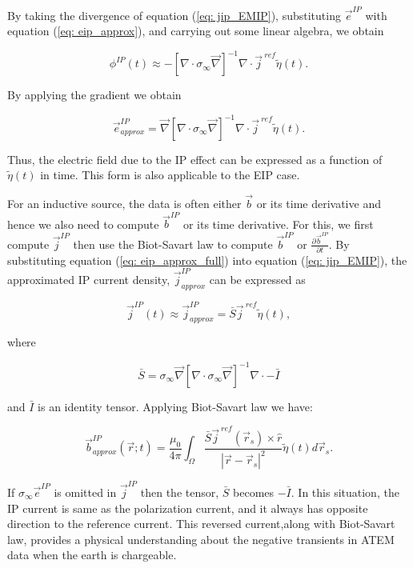 \documentclass[extra,mreferee]{gji}
\renewcommand{\div}{\nabla\cdot}
\newcommand{\grad}{\vec \nabla}
\newcommand{\siginf}{\sigma_\infty}
\renewcommand {\j}  { {\vec j} }
\renewcommand {\b}  { {\vec b} }
\newcommand {\e}  { {\vec e} }
\newcommand{\peta}{\tilde{\eta}}
\newcommand{\jref}{\j^{\ ref}}
\begin{document}
By taking the divergence of  equation (\ref{eq: jip_EMIP}), substituting  $\e^{IP}$ with equation (\ref{eq: eip_approx}), and carrying out some linear algebra, we obtain
\begin{linenomath*}
\begin{equation}
  \phi^{IP}(t) \approx -[\div \siginf\grad]^{-1}\div\jref\peta(t).
  \label{eq: phiIPapprox_general}
\end{equation}
\end{linenomath*}
By applying the gradient we obtain 
\begin{linenomath*}
\begin{equation}
    \e^{IP}_{approx} = \grad[\div \siginf\grad]^{-1}\div\jref\peta(t).
    \label{eq: eip_approx_full}
\end{equation}
\end{linenomath*}
Thus, the electric field due to the IP effect can be expressed as a function of $\peta(t)$ in time. 
This form is also applicable to the  EIP case.   

For an inductive source, the data is often either $\b$ or its time derivative and hence we also need to compute $\b^{IP}$ or its time derivative.
For this, we first compute $\j^{IP}$ then use the Biot-Savart law to compute $\b^{IP}$ or $\frac{\partial \b^{IP}}{\partial t}$. 
By substituting equation (\ref{eq: eip_approx_full}) into equation (\ref{eq: jip_EMIP}), the approximated IP current density, $\j^{IP}_{approx}$ can be expressed as
\begin{linenomath*}
\begin{equation}
  \j^{IP}(t) \approx \j^{IP}_{approx} = \bar{S}\jref\peta(t),
  \label{eq: jip_approx}
\end{equation}
\end{linenomath*}
where
\begin{linenomath*}
\begin{equation}
  \bar{S} = \siginf\grad[\div \siginf\grad]^{-1}\div-\bar{I}
\end{equation}
\end{linenomath*}
and $\bar{I}$ is an identity tensor. 
Applying Biot-Savart law we have:
\begin{linenomath*}
\begin{equation}
  \b^{IP}_{approx}(\vec{r}; t) = \frac{\mu_0}{4\pi}\int_{\Omega}  \frac{\bar{S}\j^{\ ref}(\vec{r}_s)\times\hat{r}}{|\vec{r}-\vec{r}_s|^2}\peta(t)d\vec{r}_s.
  \label{eq: BiotbIP_approx}
\end{equation}
\end{linenomath*}
If $\siginf\e^{IP}$ is omitted in  $\j^{IP}$ then the tensor, $\bar{S}$ becomes $-\bar{I}$. 
In this situation, the IP current is same as the polarization current, and it always has opposite direction to the reference current. 
This reversed current,along with Biot-Savart law,  provides a physical understanding about the negative transients in ATEM data when the earth is chargeable. 
\end{document}
